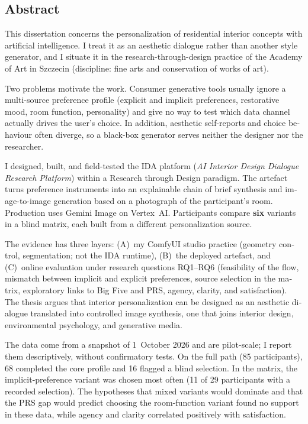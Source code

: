 \vspace{1.5em}
\begin{otherlanguage}{english}
\chapter*{Abstract}

This dissertation concerns the personalization of residential interior concepts with artificial intelligence. I treat it as an aesthetic dialogue rather than another style generator, and I situate it in the research-through-design practice of the Academy of Art in Szczecin (discipline: fine arts and conservation of works of art).

Two problems motivate the work. Consumer generative tools usually ignore a multi-source preference profile (explicit and implicit preferences, restorative mood, room function, personality) and give no way to test which data channel actually drives the user's choice. In addition, aesthetic self-reports and choice behaviour often diverge, so a black-box generator serves neither the designer nor the researcher.

I designed, built, and field-tested the IDA platform (\emph{AI Interior Design Dialogue Research Platform}) within a Research through Design paradigm. The artefact turns preference instruments into an explainable chain of brief synthesis and image-to-image generation based on a photograph of the participant's room. Production uses Gemini Image on Vertex~AI. Participants compare \textbf{six} variants in a blind matrix, each built from a different personalization source.

The evidence has three layers: (A)~my ComfyUI studio practice (geometry control, segmentation; not the IDA runtime), (B)~the deployed artefact, and (C)~online evaluation under research questions RQ1--RQ6 (feasibility of the flow, mismatch between implicit and explicit preferences, source selection in the matrix, exploratory links to Big Five and PRS, agency, clarity, and satisfaction). The thesis argues that interior personalization can be designed as an aesthetic dialogue translated into controlled image synthesis, one that joins interior design, environmental psychology, and generative media.

The data come from a snapshot of 1~October 2026 and are pilot-scale; I report them descriptively, without confirmatory tests. On the full path (85 participants), 68 completed the core profile and 16 flagged a blind selection. In the matrix, the implicit-preference variant was chosen most often (11 of 29 participants with a recorded selection). The hypotheses that mixed variants would dominate and that the PRS gap would predict choosing the room-function variant found no support in these data, while agency and clarity correlated positively with satisfaction.
\end{otherlanguage}
